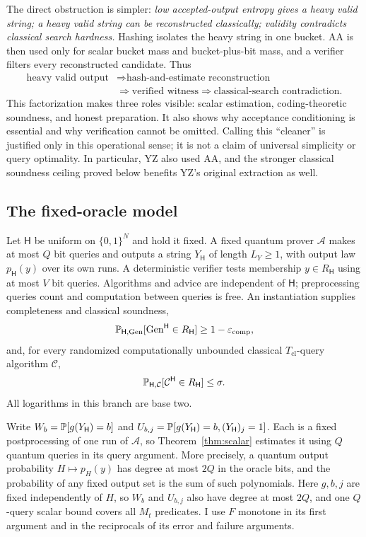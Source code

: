 \documentclass[11pt]{article}
\theoremstyle{definition}\newtheorem{definition}[theorem]{Definition}
\theoremstyle{remark}\newtheorem{remark}[theorem]{Remark}
\newcommand{\mc}{\mathcal}\newcommand{\eps}{\varepsilon}
\begin{document}
The direct obstruction is simpler: \emph{low accepted-output entropy gives a heavy valid string; a heavy valid string can be reconstructed classically; validity contradicts classical search hardness.} Hashing isolates the heavy string in one bucket. AA is then used only for scalar bucket mass and bucket-plus-bit mass, and a verifier filters every reconstructed candidate. Thus
\begin{align*}
 \text{heavy valid output}&\Longrightarrow\text{hash-and-estimate reconstruction}\\
 &\Longrightarrow\text{verified witness}\Longrightarrow\text{classical-search contradiction.}
\end{align*}
This factorization makes three roles visible: scalar estimation, coding-theoretic soundness, and honest preparation. It also shows why acceptance conditioning is essential and why verification cannot be omitted. Calling this ``cleaner'' is justified only in this operational sense; it is not a claim of universal simplicity or query optimality. In particular, YZ also used AA, and the stronger classical soundness ceiling proved below benefits YZ's original extraction as well.

\subsection{The fixed-oracle model}
Let \(\mathsf H\) be uniform on \(\{0,1\}^N\) and hold it fixed. A fixed quantum prover \(\mc A\) makes at most \(Q\) bit queries and outputs a string \(Y_{\mathsf H}\) of length \(L_Y\ge1\), with output law \(p_{\mathsf H}(y)\) over its own runs. A deterministic verifier tests membership \(y\in R_{\mathsf H}\) using at most \(V\) bit queries. Algorithms and advice are independent of \(\mathsf H\); preprocessing queries count and computation between queries is free. An instantiation supplies completeness and classical soundness,
\[
 \Prb_{\mathsf H,\mathrm{Gen}}[\mathrm{Gen}^{\mathsf H}\in R_{\mathsf H}]\ge1-\eps_{\mathrm{comp}},
\]
and, for every randomized computationally unbounded classical \(T_{\mathrm{cl}}\)-query algorithm \(\mc C\),
\[
 \Prb_{\mathsf H,\mc C}[\mc C^{\mathsf H}\in R_{\mathsf H}]\le\sigma.
\]
All logarithms in this branch are base two.

Write \(W_b=\mathbb P[g(Y_{\mathsf H})=b]\) and \(U_{b,j}=\mathbb P[g(Y_{\mathsf H})=b,(Y_{\mathsf H})_j=1]\). Each is a fixed postprocessing of one run of \(\mc A\), so Theorem~\ref{thm:scalar} estimates it using \(Q\) quantum queries in its query argument. More precisely, a quantum output probability \(H\mapsto p_H(y)\) has degree at most \(2Q\) in the oracle bits, and the probability of any fixed output set is the sum of such polynomials. Here \(g,b,j\) are fixed independently of \(H\), so \(W_b\) and \(U_{b,j}\) also have degree at most \(2Q\), and one \(Q\)-query scalar bound covers all \(M_t\) predicates. I use \(F\) monotone in its first argument and in the reciprocals of its error and failure arguments.
\end{document}
